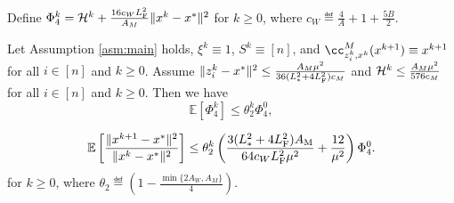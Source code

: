 \documentclass[11pt]{article}
\begin{document}
	
	
	
	
	Define $\Phi_4^{k} = {\cal H}^k+ \frac{16c_WL_{\rm F}^2}{A_M} \|x^k-x^*\|^2$ for $k\geq 0$, where $c_W \eqdef \frac{4}{A} + 1 + \frac{5B}{2}$. 
	
	\begin{theorem}\label{th:supl-3PcBL2}
		Let Assumption \ref{asm:main} holds, $\xi^k \equiv 1$, $S^k\equiv [n]$, and $\cc_{z_i^k, x^k}^M (x^{k+1}) \equiv x^{k+1}$ for all $i\in[n]$ and $k\geq 0$. Assume $\|z_i^k-x^*\|^2 \leq \frac{A_M \mu^2}{36(L_{*}^2 + 4L_{\rm F}^2)c_M}$ and ${\cal H}^k \leq \frac{A_M\mu^2}{576c_M}$ for all $i\in [n]$ and $k\geq 0$. Then we have 
		$$
		\mathbb{E}[\Phi_4^k] \leq \theta_2^k \Phi_4^0, 
		$$
		
		$$
		\mathbb{E} \left[   \frac{\|x^{k+1}-x^*\|^2}{\|x^k-x^*\|^2} \right]  \leq \theta_2^k \left( \frac{3(L_{*}^2+4L_{\rm F}^2)A_{\rm M}}{64c_WL_{\rm F}^2\mu^2} + \frac{12}{\mu^2}  \right) \Phi_4^0. 
		$$
		for $k\geq 0$, where $\theta_2 \eqdef \left(  1 - \frac{\min\{  2A_W, A_M  \}}{4}  \right)$. 
	\end{theorem}
	
\end{document}
